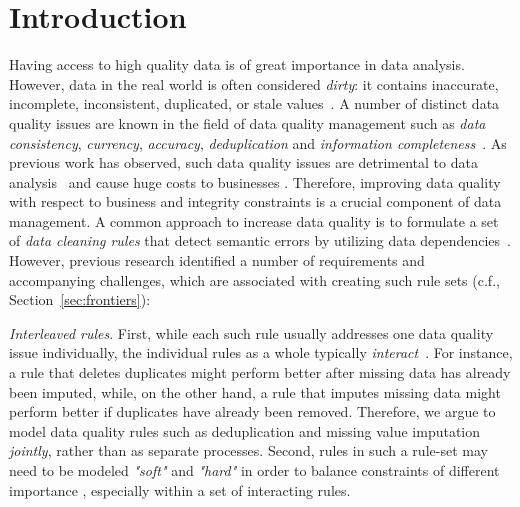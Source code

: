 \section{Introduction}
\label{sec:intro}

Having access to high quality data is of great importance in data analysis. However, data in the real world is often considered \textit{dirty}: it contains inaccurate, incomplete, inconsistent, duplicated, or stale values~\cite{chu2004blissful}. A number of distinct data quality issues are known in the field of data quality management such as \textit{data consistency}, \textit{currency}, \textit{accuracy}, \textit{deduplication} and \textit{information completeness}~\cite{fan2012foundations}. As previous work has observed, such data quality issues are detrimental to data analysis~\cite{national2013Frontiers,Fan:2008:CFD:1366102.1366103} and cause huge costs to busi\-nesses \cite{waynew.eckerson2002}. Therefore, improving data quality with respect to business and integrity constraints is a crucial component of data management. 
A common approach to increase data quality is to formulate a set of \textit{data cleaning rules} that detect semantic errors by utilizing data dependencies~\cite{fan2012foundations, Arasu:2009:LDC:1546683.1547340, Dallachiesa:2013:NCD:2463676.2465327, llunaticVDLB2013b}. However, previous research identified a number of requirements and accompanying challenges, which are associated with creating such rule sets (c.f., Section~\ref{sec:frontiers}): 

\textit{Interleaved rules}. First, while each such rule usually addresses one data quality issue individually, the individual rules as a whole typically \textit{interact}~\cite{fan2012foundations, Fan:2014:IRM:2628135.2567657}. For instance, a rule that deletes duplicates might perform better after missing data has already been imputed, while, on the other hand, a rule that imputes missing data might perform better if duplicates have already been removed. Therefore, we argue to model data quality rules such as deduplication and missing value imputation \textit{jointly}, rather than as separate processes.
Second, rules in such a rule-set may need to be modeled \textit{"soft"} and \textit{"hard"} in order to balance constraints of different importance \cite{Yakout:2013:DSU:2463676.2463706}, especially within a set of interacting rules. 

